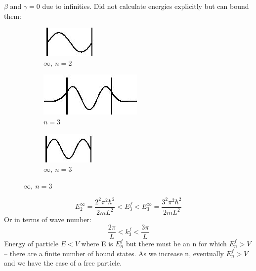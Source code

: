 \documentclass[a4paper, 11pt, normalem]{report}
\begin{document}
$\beta$ and $\gamma = 0$ due to infinities.
Did not calculate energies explicitly but can bound them:
\begin{figure}[H]
    \centering
    \begin{subfigure}{0.18\textwidth}
        \includegraphics{n=2.jpg}
        \caption{$\infty,~n = 2$}
    \end{subfigure}
    \begin{subfigure}{0.30\textwidth}
        \includegraphics{n=3.jpg}
        \caption{$n = 3$}
    \end{subfigure}
    \begin{subfigure}{0.2\textwidth}
        \includegraphics{infty3.jpg}
        \caption{$\infty,~n = 3$}
    \end{subfigure}
\end{figure}
\begin{equation}
    E_{2}^{\infty} = \frac{2^{2}\pi^{2}\hbar^{2}}{2mL^{2}} < E_{3}^{f} < E_{3}^{\infty} = \frac{3^{2}\pi^{2}\hbar^{2}}{2mL^{2}}
\end{equation}
Or in terms of wave number:
\begin{equation}
    \frac{2\pi}{L} < k_{3}^{f} < \frac{3\pi}{L}
\end{equation}
Energy of particle $E < V$ where E is $E_{n}^{f}$ but there must be an n for which $E_{n}^{f} > V$ -- there are a finite number of bound states.
As we increase n, eventually $E_{n}^{f} > V$ and we have the case of a free particle.
\end{document}

